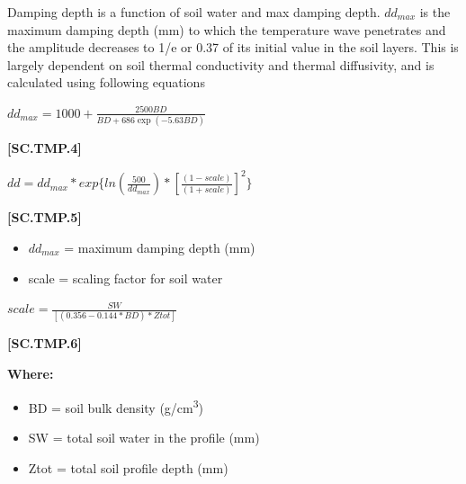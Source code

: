 Damping depth is a function of soil water and max damping depth. \(dd_{max}\)  is the maximum damping depth (mm) to which the temperature wave penetrates and the amplitude decreases to 1/e or 0.37 of its initial value in the soil layers. This is largely dependent on soil thermal conductivity and thermal diffusivity, and is calculated using following equations
        \vspace{0.2cm}

    \begin{center}
\(dd_{max}=1000 + \frac{2500BD}{BD+686\exp(-5.63BD)}\)
    \end{center}
        \vspace{0.5cm} 
    
            {\raggedleft \textbf{[SC.TMP.4]}\par}
            \vspace{0.5cm}

    \begin{center}
\(dd = dd_{max} * exp\{ln (\frac{500}{dd_{max}}) * [\frac{(1-scale)}{(1+scale)}]^2\}\)
    \end{center}
        \vspace{0.5cm} 
    
            {\raggedleft \textbf{[SC.TMP.5]}\par}
            \vspace{0.5cm}
        \begin{itemize}
            \item \(dd_{max}\)	=	maximum damping depth (mm)
            \item scale	=	scaling factor for soil water
        \end{itemize}
            \vspace{0.5cm}

    \begin{center}
\(scale=\frac{SW}{[(0.356-0.144*BD)*Ztot]}\)
    \end{center}
        \vspace{0.5cm} 
    
            {\raggedleft \textbf{[SC.TMP.6]}\par}
            \vspace{0.5cm}

        \textbf{Where:}
        
        \begin{itemize}
            \item BD	=	soil bulk density (g/cm\textsuperscript{3})
            \item SW	=	total soil water in the profile (mm)
            \item Ztot	=	total soil profile depth (mm)
        \end{itemize}

